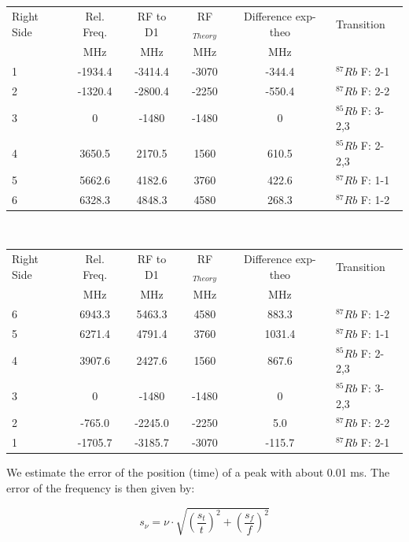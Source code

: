 


\begin{center}
\begin{tabular}[H]{l | c c c c l}
Right Side & Rel. Freq.\footnotemark[1] & RF to D1 & RF$_{Theory}$ & Difference exp-theo & Transition \\
 & MHz & MHz & MHz & MHz \\ \hline
1 & -1934.4 & -3414.4 & -3070 & -344.4 & $^{87}Rb$ F: 2-1 \\
2 & -1320.4 & -2800.4 & -2250 & -550.4 & $^{87}Rb$ F: 2-2 \\
3 &        0      & -1480 & -1480 & 0 & $^{85}Rb$ F: 3-2,3 \\
4 & 3650.5  & 2170.5 & 1560 & 610.5 & $^{85}Rb$ F: 2-2,3\\
5 & 5662.6  & 4182.6 & 3760 & 422.6 &$^{87}Rb$ F: 1-1\\
6 & 6328.3  & 4848.3 & 4580 & 268.3 & $^{87}Rb$ F: 1-2\\
\end{tabular}\\
\end{center}



\begin{center}
\begin{tabular}[H]{l | c c c c l}
Right Side & Rel. Freq.\footnotemark[1] & RF to D1 & RF$_{Theory}$ & Difference exp-theo & Transition \\
 & MHz & MHz & MHz & MHz \\ \hline
6 & 6943.3 & 5463.3 & 4580 & 883.3 & $^{87}Rb$ F: 1-2 \\
5 & 6271.4 & 4791.4 & 3760 & 1031.4 &$^{87}Rb$ F: 1-1 \\
4 & 3907.6 & 2427.6 & 1560 & 867.6 & $^{85}Rb$ F: 2-2,3\\
3 & 0 	  & -1480   & -1480 & 0 & $^{85}Rb$ F: 3-2,3 \\
2 & -765.0  & -2245.0& -2250 & 5.0 & $^{87}Rb$ F: 2-2 \\
1 & -1705.7& -3185.7& -3070 & -115.7 & $^{87}Rb$ F: 2-1 \\
\end{tabular}
\end{center}

We estimate the error of the position (time) of a peak with about 0.01 ms. The error of the frequency is then given by:

$$s_\nu = \nu\cdot\sqrt{\left(\frac{s_t}{t}\right)^2 + \left(\frac{s_f}{f}\right)^2}$$

